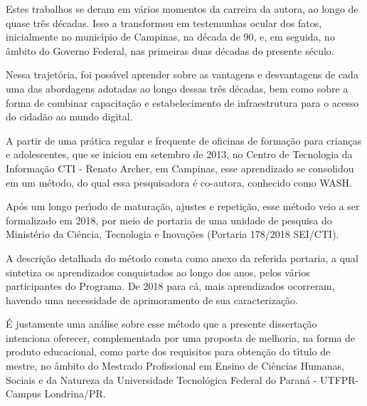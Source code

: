 \documentclass[
12pt,		%
openright,	%
twoside,  %
a4paper,			%
chapter=TITLE,		%
english,			%
french,				%
spanish,			%
brazil				%
]{USPSC-classe/USPSC}
\begin{document}
Estes trabalhos se deram em v\'arios momentos da carreira da autora, ao longo de quase tr\^es d\'ecadas. Isso a transformou em testemunhas ocular dos fatos, inicialmente no  munic\'{\i}pio de Campinas, na d\'ecada de 90, e, em seguida, no \^ambito do Governo Federal, nas primeiras duas d\'ecadas do presente s\'eculo.









Nessa trajet\'oria, foi poss\'{\i}vel aprender sobre as vantagens e desvantagens de cada uma das abordagens adotadas ao longo dessas tr\^es d\'ecadas, bem como sobre a forma de combinar capacita\c{c}\~ao e estabelecimento de infraestrutura para o acesso do cidad\~ao ao mundo digital.









A partir de uma pr\'atica regular e frequente de oficinas de forma\c{c}\~ao para  crian\c{c}as e adolescentes, que se iniciou em setembro de 2013, no Centro de Tecnologia da Informa\c{c}\~ao CTI - Renato Archer, em Campinas, esse aprendizado se consolidou em um m\'etodo, do qual essa pesquisadora \'e co-autora, conhecido como WASH.









Ap\'os um longo per\'{\i}odo de matura\c{c}\~ao, ajustes e repeti\c{c}\~ao, esse m\'etodo veio a ser formalizado em 2018, por meio de portaria de uma unidade de pesquisa do Minist\'erio da Ci\^encia, Tecnologia e Inova\c{c}\~oes (Portaria 178/2018 SEI/CTI).









A descri\c{c}\~ao detalhada do m\'etodo consta como anexo da referida portaria, a qual sintetiza os aprendizados conquistados ao longo dos anos, pelos v\'arios participantes do Programa. De 2018 para c\'a, mais aprendizados ocorreram, havendo uma necessidade de aprimoramento de sua caracteriza\c{c}\~ao.









\'E justamente uma an\'alise sobre esse m\'etodo que a presente disserta\c{c}\~ao intenciona oferecer, complementada por uma proposta de melhoria, na forma de produto educacional, como parte dos requisitos para obten\c{c}\~ao do t\'{\i}tulo de mestre, no \^ambito do Mestrado Profissional em Ensino de Ci\^encias Humanas, Sociais e da Natureza da Universidade  Tecnol\'ogica Federal do Paran\'a - UTFPR- Campus Londrina/PR.
\end{document}
